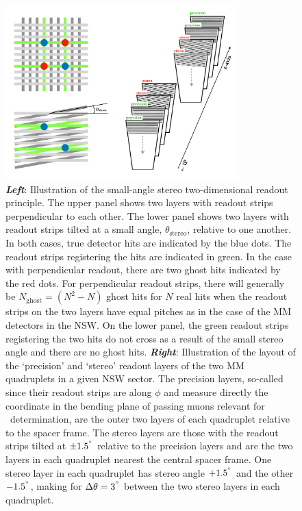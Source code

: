 \begin{figure}[!htb]
    \begin{center}
        \includegraphics[width=0.8\textwidth]{figures/nsw/mm_stereo_cartoonPDF}
        \caption{
            \textbf{\textit{Left}}: Illustration of the small-angle stereo two-dimensional readout principle.
                The upper panel shows two layers with readout strips perpendicular to each other.
                The lower panel shows two layers with readout strips tilted at a small angle,
                $\theta_{\text{stereo}}$, relative to one another.
                In both cases, true detector hits are indicated by the blue dots.
                The readout strips registering the hits are indicated in green.
                In the case with perpendicular readout, there are two ghost hits indicated
                by the red dots.
                For perpendicular readout strips, there will generally be $N_{\text{ghost}} = (N^2 - N)$
                ghost hits for $N$ real hits when the readout strips on the two layers have
                equal pitches as in the case of the MM detectors in the NSW.
                On the lower panel, the green readout strips registering the two hits
                do not cross as a result of the small stereo angle and there are no ghost hits.
            \textbf{\textit{Right}}: Illustration of the layout of the `precision' and `stereo'
                readout layers of the two MM quadruplets in a given NSW sector.
                The precision layers, so-called since their readout strips are along $\phi$ and measure directly the
                coordinate in the bending plane of passing muons relevant for \pT~determination, are the outer two layers of
                each quadruplet relative to the spacer frame.
                The stereo layers are those with the readout strips tilted at $\pm 1.5^{\degree}$ relative to the precision layers and are the two layers
                in each quadruplet nearest the central spacer frame.
                One stereo layer in each quadruplet has stereo angle $+1.5^{\degree}$ and the other $-1.5^{\degree}$, making
                for $\Delta \theta = 3^{\degree}$ between the two stereo layers in each quadruplet.
        }
        \label{fig:mm_stereo}
    \end{center}
\end{figure}

